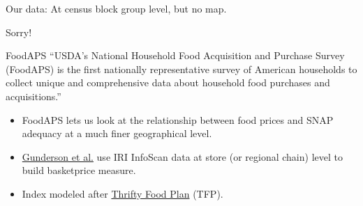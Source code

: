 \documentclass{beamer}
\begin{document}
{
    \begin{frame}[plain]
     \end{frame}
}

\begin{frame}

\begin{center}\href{http://garretchristensen.shinyapps.io/Food_Price_Maps}{}

\vskip0.25in
\hrulefill

\vskip0.25in
Our data: At census block group level, but no map. 

Sorry!
\end{center}
\end{frame}

\begin{frame}{FoodAPS}
``USDA's National Household Food Acquisition and Purchase Survey (FoodAPS) is the first nationally representative survey of American households to collect unique and comprehensive data about household food purchases and acquisitions.''
\begin{itemize}
\item FoodAPS lets us look at the relationship between food prices and SNAP adequacy at a much finer geographical level.
\item  \href{https://www.ers.usda.gov/media/8612/priceindexdata.pdf}{Gunderson et al.} use IRI InfoScan data at store (or regional chain) level to build basketprice measure.
\item Index modeled after \href{https://www.cnpp.usda.gov/sites/default/files/usda_food_plans_cost_of_food/TFP2006Report.pdf}{Thrifty Food Plan} (TFP). 
\end{itemize}
\end{frame}
\end{document}
